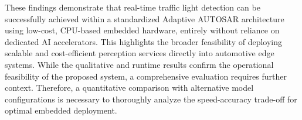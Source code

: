 These findings demonstrate that real-time traffic light detection can be successfully achieved within a standardized Adaptive AUTOSAR architecture using low-cost, CPU-based embedded hardware, entirely without reliance on dedicated AI accelerators. This highlights the broader feasibility of deploying scalable and cost-efficient perception services directly into automotive edge systems. While the qualitative and runtime results confirm the operational feasibility of the proposed system, a comprehensive evaluation requires further context. Therefore, a quantitative comparison with alternative model configurations is necessary to thoroughly analyze the speed-accuracy trade-off for optimal embedded deployment.







